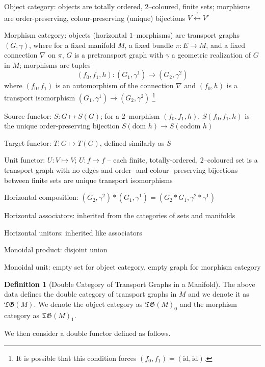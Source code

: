 \documentclass{amsart}
\renewcommand{\to}[1][]{\stackrel{#1}{\longrightarrow}}
\renewcommand{\mapsto}{\longmapsto}
\newcommand{\codom}{\text{codom }}
\newcommand{\dom}{\text{dom }}
\newcommand{\id}{\text{id}}
\newcommand{\TG}{\mathfrak{TG}}
\newcommand{\li}[1][]{\ifthenelse{\equal{#1}{}}{\item}{\item \label{#1}}}
\newenvironment{enmrt}{
  \enumerate[(i)]
  \setlength{\itemsep}{0pt}
}{
  \endenumerate
}
\numberwithin{thm}{section}
\theoremstyle{definition}
\newtheorem{defn}[thm]{Definition}
\begin{document}
\begin{enmrt}
\li Object category: objects are totally ordered, $2$--coloured, finite sets;
morphisms are order-preserving, colour-preserving (unique) bijections
$V \stackrel{!}{\longleftrightarrow} V'$

\li Morphism category: objects (horizontal $1$--morphisms) are transport graphs
$(G, \gamma)$, where for a fixed manifold $M$, a fixed bundle $\pi : E \to M$,
and a fixed connection $\nabla$ on $\pi$, $G$ is a pretransport graph with
$\gamma$ a geometric realization of $G$ in $M$; morphisms are tuples
\[
  (f_0, f_1, h) : (G_1, \gamma^1) \to (G_2, \gamma^2)
\]
where $(f_0, f_1)$ is an automorphism of the connection $\nabla$ and
$(f_0, h)$ is a transport isomorphism $(G_1, \gamma^1) \to (G_2, \gamma^2)$
\footnote{It is possible that this condition forces $(f_0, f_1) = (\id, \id)$.}

\li Source functor: $S : G \mapsto S(G)$; for a $2$--morphism $(f_0, f_1, h)$,
$S(f_0, f_1, h)$ is the unique order-preserving bijection
$S(\dom h) \to S(\codom h)$

\li Target functor: $T : G \mapsto T(G)$, defined similarly as $S$

\li Unit functor: $U : V \mapsto V$; $U : f \mapsto f$ -- each finite,
totally-ordered, $2$--coloured set is a transport graph with no edges and
order- and colour- preserving bijections between finite sets are unique
transport isomorphisms

\li Horizontal composition:
$(G_2, \gamma^2) * (G_1, \gamma^1) = (G_2 * G_1, \gamma^2 * \gamma^1)$

\li Horizontal associators: inherited from the categories of sets and manifolds

\li Horizontal unitors: inherited like associators

\li Monoidal product: disjoint union

\li Monoidal unit: empty set for object category, empty graph for morphism
category
\end{enmrt}

\begin{defn}[Double Category of Transport Graphs in a Manifold]
The above data defines the double category of transport graphs in $M$ and we
denote it as $\TG(M)$. We denote the object category as $\TG(M)_0$ and the
morphism category as $\TG(M)_1$.
\end{defn}

We then consider a double functor defined as follows.
\end{document}
